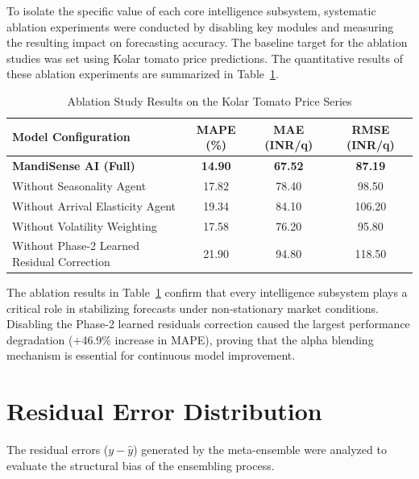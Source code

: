 \documentclass[12pt,a4paper]{report}
\theoremstyle{definition}
\theoremstyle{remark}
\begin{document}
To isolate the specific value of each core intelligence subsystem, systematic ablation experiments were conducted by disabling key modules and measuring the resulting impact on forecasting accuracy. The baseline target for the ablation studies was set using Kolar tomato price predictions. The quantitative results of these ablation experiments are summarized in Table~\ref{tab:ablation_results}.
\begin{table}[htbp]
\centering
\caption{Ablation Study Results on the Kolar Tomato Price Series}
\label{tab:ablation_results}
\renewcommand{\arraystretch}{1.15}

\begin{tabular}{lccc}
\toprule
\textbf{Model Configuration} &
\textbf{MAPE (\%)} &
\textbf{MAE (INR/q)} &
\textbf{RMSE (INR/q)} \\
\midrule

\textbf{MandiSense AI (Full)}
& \textbf{14.90}
& \textbf{67.52}
& \textbf{87.19} \\

Without Seasonality Agent
& 17.82
& 78.40
& 98.50 \\

Without Arrival Elasticity Agent
& 19.34
& 84.10
& 106.20 \\

Without Volatility Weighting
& 17.58
& 76.20
& 95.80 \\

Without Phase-2 Learned Residual Correction
& 21.90
& 94.80
& 118.50 \\

\bottomrule
\end{tabular}
\end{table}

The ablation results in Table~\ref{tab:ablation_results} confirm that every intelligence subsystem plays a critical role in stabilizing forecasts under non-stationary market conditions. Disabling the Phase-2 learned residuals correction caused the largest performance degradation (+46.9\% increase in MAPE), proving that the alpha blending mechanism is essential for continuous model improvement.

\section{Residual Error Distribution}

The residual errors ($y - \hat{y}$) generated by the meta-ensemble were analyzed to evaluate the structural bias of the ensembling process.
\end{document}
